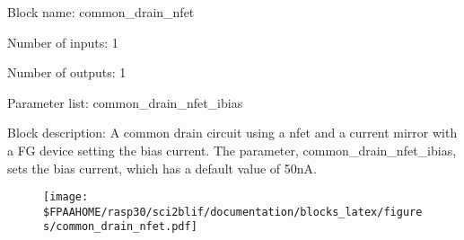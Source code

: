 \pagebreak

Block name: common\_drain\_nfet

Number of inputs: 1

Number of outputs: 1

Parameter list: common\_drain\_nfet\_ibias

Block description: 
A common drain circuit using a nfet and a current mirror with a FG device setting the bias current. The parameter, common\_drain\_nfet\_ibias, sets the bias current, which has a default value of 50nA.

\begin{figure}[H]  %
\texttt{[image: \$FPAAHOME/rasp30/sci2blif/documentation/blocks\_latex/figures/common\_drain\_nfet.pdf]}
\end{figure}

